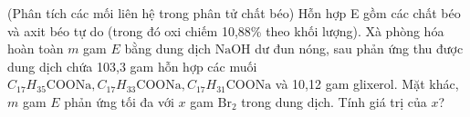 \begin{vd}(Phân tích các mối liên hệ trong phân tử chất béo)
	Hỗn hợp E gồm các chất béo và axit béo tự do (trong đó oxi chiếm 10,88\% theo khối lượng). Xà phòng hóa hoàn toàn $m$ gam $E$ bằng dung dịch $\mathrm{NaOH}$ dư đun nóng, sau phản ứng thu được dung dịch chứa 103,3
	gam hỗn hợp các muối $C_{17} H_{35} \mathrm{COONa}, C_{17} H_{33} \mathrm{COONa}, C_{17} H_{31} \mathrm{COONa}$ và 10,12 gam glixerol. Mặt khác, $m$ gam $E$ phản ứng tối đa với $x$ gam $\mathrm{Br}_2$ trong dung dịch. Tính giá trị của $x$?
	\loigiai{
	}
\end{vd}

